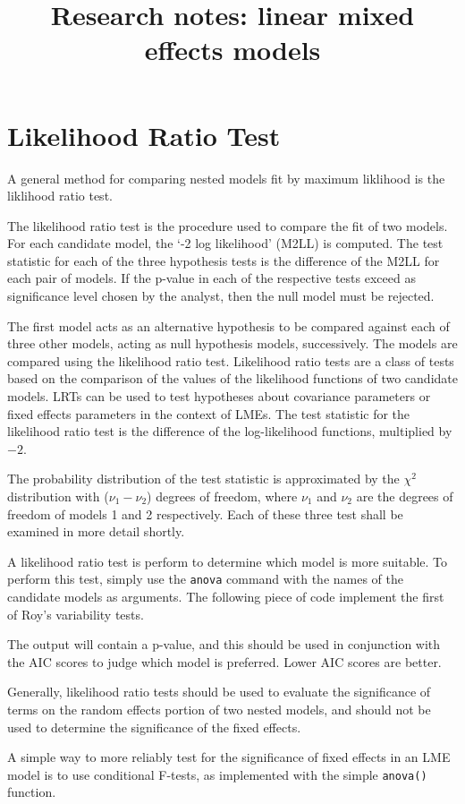 \documentclass[12pt, a4paper]{article}
\title{Research notes: linear mixed effects models}
\author{ } \date{ }
\theoremstyle{plain}
\theoremstyle{definition}
\theoremstyle{remark}
\begin{document}
	


\section{Likelihood Ratio Test}
A general method for comparing nested models fit by maximum liklihood is the liklihood ratio 
test. 

The likelihood ratio test is the procedure used to compare the fit of two models. For each candidate model,
the `-2 log likelihood' (M2LL) is computed. The test statistic for each of the three
hypothesis tests is the difference of the M2LL for each pair of models. If the p-value in each of the respective tests exceed as significance level chosen by the analyst, then
the null model must be rejected.

The first model acts as an alternative hypothesis to be compared against each of three other models, acting as null hypothesis models, successively. The models are compared using the likelihood ratio test. Likelihood ratio tests are a class of tests based on the comparison of the values of the likelihood functions of two candidate models. LRTs can be used to test hypotheses about covariance parameters or fixed effects parameters in the context of LMEs. The test statistic for the likelihood ratio test is the difference of the log-likelihood functions, multiplied by $-2$.

The probability distribution of the test statistic is approximated by the $\chi^2$ distribution with ($\nu_{1} - \nu_{2}$) degrees of freedom, where $\nu_{1}$ and $\nu_{2}$ are the degrees of freedom of models 1 and 2 respectively. Each of these three test shall be examined in more detail shortly.

A likelihood ratio test is perform to determine which model is more suitable. To perform this test, simply use the \texttt{anova} command with the names of the candidate models as arguments. The following piece of code implement the first of Roy's variability tests.

The output will contain a p-value, and this should be used in conjunction with the AIC scores to judge which model is preferred. Lower AIC scores are better. 

Generally, likelihood ratio tests should be used to evaluate the significance of terms on the random effects portion of two nested models, and should not be used to determine the 
significance of the fixed effects. 

A simple way to more reliably test for the significance of fixed effects in an LME model is to use conditional F-tests, as implemented with the simple \texttt{anova()} function. 
\end{document}
